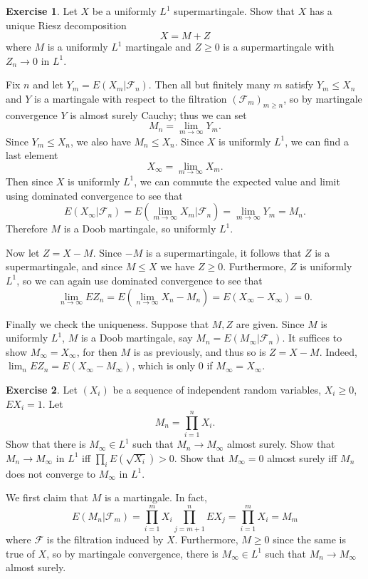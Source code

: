 \documentclass[10pt]{article}
\theoremstyle{definition}
\newtheorem{exer}{Exercise}
\begin{document}
\begin{exer}
Let $X$ be a uniformly $L^1$ supermartingale.
Show that $X$ has a unique Riesz decomposition
$$X = M + Z$$
where $M$ is a uniformly $L^1$ martingale and $Z \geq 0$ is a supermartingale with $Z_n \to 0$ in $L^1$.
\end{exer}

Fix $n$ and let $Y_m = E(X_m|\mathcal F_n)$.
Then all but finitely many $m$ satisfy $Y_m \leq X_n$ and $Y$ is a martingale with respect to the filtration $(\mathcal F_m)_{m \geq n}$, so by martingale convergence $Y$ is almost surely Cauchy; thus we can set
$$M_n = \lim_{m \to \infty} Y_m.$$
Since $Y_m \leq X_n$, we also have $M_n \leq X_n$.
Since $X$ is uniformly $L^1$, we can find a last element
$$X_\infty = \lim_{m \to \infty} X_m.$$
Then since $X$ is uniformly $L^1$, we can commute the expected value and limit using dominated convergence to see that
$$E(X_\infty|\mathcal F_n) = E\left(\lim_{m \to \infty} X_m\bigg|\mathcal F_n\right) = \lim_{m \to \infty} Y_m = M_n.$$
Therefore $M$ is a Doob martingale, so uniformly $L^1$.

Now let $Z = X - M$. Since $-M$ is a supermartingale, it follows that $Z$ is a supermartingale, and since $M \leq X$ we have $Z \geq 0$.
Furthermore, $Z$ is uniformly $L^1$, so we can again use dominated convergence to see that
$$\lim_{n \to \infty} EZ_n = E\left(\lim_{n \to \infty} X_n - M_n\right) = E(X_\infty - X_\infty) = 0.$$

Finally we check the uniqueness. Suppose that $M,Z$ are given. Since $M$ is uniformly $L^1$, $M$ is a Doob martingale, say $M_n = E(M_\infty|\mathcal F_n)$.
It suffices to show $M_\infty = X_\infty$, for then $M$ is as previously, and thus so is $Z = X - M$.
Indeed, $\lim_n EZ_n = E(X_\infty - M_\infty)$, which is only $0$ if $M_\infty = X_\infty$.

\begin{exer}
Let $(X_i)$ be a sequence of independent random variables, $X_i \geq 0$, $EX_i = 1$. Let
$$M_n = \prod_{i=1}^n X_i.$$
Show that there is $M_\infty \in L^1$ such that $M_n \to M_\infty$ almost surely.
Show that $M_n \to M_\infty$ in $L^1$ iff $\prod_i E(\sqrt{X_i}) > 0$.
Show that $M_\infty = 0$ almost surely iff $M_n$ does not converge to $M_\infty$ in $L^1$.
\end{exer}

We first claim that $M$ is a martingale. In fact,
$$E(M_n|\mathcal F_m) = \prod_{i=1}^m X_i \prod_{j=m+1}^n EX_j = \prod_{i=1}^m X_i = M_m$$
where $\mathcal F$ is the filtration induced by $X$.
Furthermore, $M \geq 0$ since the same is true of $X$, so by martingale convergence, there is $M_\infty \in L^1$ such that $M_n \to M_\infty$ almost surely.
\end{document}
